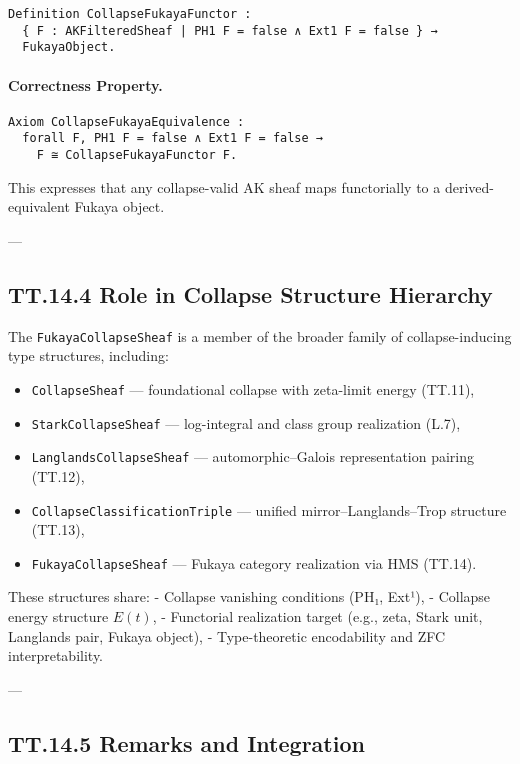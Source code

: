 \documentclass[11pt]{article}
\begin{document}
\begin{verbatim}
Definition CollapseFukayaFunctor :
  { F : AKFilteredSheaf | PH1 F = false ∧ Ext1 F = false } →
  FukayaObject.
\end{verbatim}

\paragraph{Correctness Property.}
\begin{verbatim}
Axiom CollapseFukayaEquivalence :
  forall F, PH1 F = false ∧ Ext1 F = false →
    F ≅ CollapseFukayaFunctor F.
\end{verbatim}

This expresses that any collapse-valid AK sheaf maps functorially to a derived-equivalent Fukaya object.

---

\subsection*{TT.14.4 Role in Collapse Structure Hierarchy}

The \texttt{FukayaCollapseSheaf} is a member of the broader family of collapse-inducing type structures, including:

\begin{itemize}
  \item \texttt{CollapseSheaf} — foundational collapse with zeta-limit energy (TT.11),
  \item \texttt{StarkCollapseSheaf} — log-integral and class group realization (L.7),
  \item \texttt{LanglandsCollapseSheaf} — automorphic–Galois representation pairing (TT.12),
  \item \texttt{CollapseClassificationTriple} — unified mirror–Langlands–Trop structure (TT.13),
  \item \texttt{FukayaCollapseSheaf} — Fukaya category realization via HMS (TT.14).
\end{itemize}

These structures share:
- Collapse vanishing conditions (PH₁, Ext¹),
- Collapse energy structure \( E(t) \),
- Functorial realization target (e.g., zeta, Stark unit, Langlands pair, Fukaya object),
- Type-theoretic encodability and ZFC interpretability.

---

\subsection*{TT.14.5 Remarks and Integration}
\end{document}
